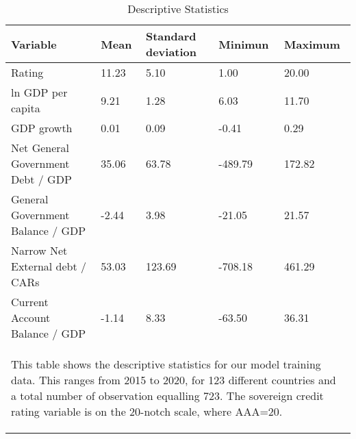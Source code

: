 
\begin{table}[tb!]
\footnotesize
\center
\caption{Descriptive Statistics}
\label{tab:tab1}
\begin{tabularx}{\textwidth}{p{7cm} X X X X}
\hline
Variable & Mean & Standard deviation & Minimun & Maximum\\
\hline
Rating &  11.23  &  5.10  &  1.00  &  20.00 \\
ln GDP per capita &  9.21  &  1.28  &  6.03  &  11.70 \\
GDP growth &  0.01  &  0.09  &  -0.41  &  0.29 \\
Net General Government Debt / GDP &  35.06  &  63.78  &  -489.79  &  172.82 \\
General Government Balance / GDP &  -2.44  &  3.98  &  -21.05  &  21.57 \\
Narrow Net External debt / CARs &  53.03  &  123.69  &  -708.18  &  461.29 \\
Current Account Balance / GDP &  -1.14  &  8.33  &  -63.50  &  36.31 \\
\hline
\multicolumn{5}{p{\textwidth}}{\begin{footnotesize}This table shows the descriptive statistics for our model training data. This ranges from 2015 to 2020, for 123 different countries and a total number of observation equalling 723. The sovereign credit rating variable is on the 20-notch scale, where AAA=20. 
\end{footnotesize}
}
\end{tabularx}
\end{table}
